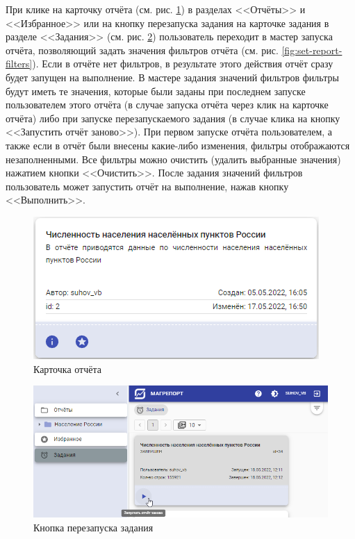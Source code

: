 \documentclass[../user-manual.tex]{subfiles}
\begin{document}
	При клике на карточку отчёта (см. рис. \ref{fig:report-card}) в разделах <<Отчёты>> и <<Избранное>> или на кнопку перезапуска задания на карточке задания в разделе <<Задания>> (см. рис. \ref{fig:restart-task-button}) пользователь переходит в мастер запуска отчёта, позволяющий задать значения фильтров отчёта (см. рис. \ref{fig:set-report-filters}). Если в отчёте нет фильтров, в результате этого действия отчёт сразу будет запущен на выполнение. В мастере задания значений фильтров фильтры будут иметь те значения, которые были заданы при последнем запуске пользователем этого отчёта (в случае запуска отчёта через клик на карточке отчёта) либо при запуске перезапускаемого задания (в случае клика на кнопку <<Запустить отчёт заново>>). При первом запуске отчёта пользователем, а также если в отчёт были внесены какие-либо изменения, фильтры отображаются незаполненными. Все фильтры можно очистить (удалить выбранные значения) нажатием кнопки <<Очистить>>. После задания значений фильтров пользователь может запустить отчёт на выполнение, нажав кнопку <<Выполнить>>.
	
	\begin{figure}[h]
		\centering
		\includegraphics[width=\graphicswidth]{img/2-report-card.png}
		\caption{Карточка отчёта}
		\label{fig:report-card}
	\end{figure}	
	
	\begin{figure}[h]
		\centering
		\includegraphics[width=\graphicswidth]{img/3-restart-task-button.png}
		\caption{Кнопка перезапуска задания}
		\label{fig:restart-task-button}
	\end{figure}
\end{document}
